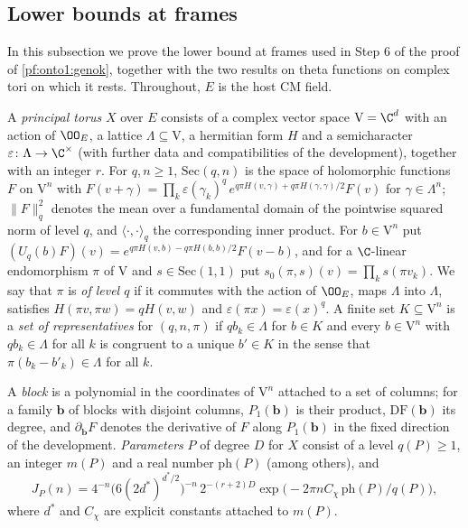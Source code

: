 \subsection{Lower bounds at frames}\label{sec:pf:onto1:frames}

In this subsection we prove the lower bound at frames used in Step 6 of the proof of \cref{pf:onto1:genok}, together with the
two results on theta functions on complex tori on which it rests. Throughout, $E$ is the host CM field.

\begin{definition}\label{pf:onto1:ptorus}
A \emph{principal torus} $X$ over $E$ consists of a complex vector space $\mathrm{V}=\C^{d}$ with an action of $\OO_E$, a lattice
$\Lambda\subseteq\mathrm V$, a hermitian form $H$ and a semicharacter $\varepsilon\colon\Lambda\to\C^\times$ (with further
data and compatibilities of the development), together with an integer $r$. For $q,n\ge1$, $\mathrm{Sec}(q,n)$ is the space of
holomorphic functions $F$ on $\mathrm V^n$ with $F(v+\gamma)=\prod_k\varepsilon(\gamma_k)^q\,e^{q\pi H(v,\gamma)+q\pi H(\gamma,\gamma)/2}F(v)$ for
$\gamma\in\Lambda^n$; $\|F\|_q^2$ denotes the mean over a fundamental domain of the pointwise squared norm of level $q$, and
$\langle\cdot,\cdot\rangle_q$ the corresponding inner product. For $b\in\mathrm V^n$ put $(U_q(b)F)(v)=e^{q\pi H(v,b)-q\pi H(b,b)/2}F(v-b)$, and
for a $\C$-linear endomorphism $\pi$ of $\mathrm V$ and $s\in\mathrm{Sec}(1,1)$ put $s_0(\pi,s)(v)=\prod_ks(\pi v_k)$. We say that $\pi$ is \emph{of level $q$} if it commutes
with the action of $\OO_E$, maps $\Lambda$ into $\Lambda$, satisfies $H(\pi v,\pi w)=qH(v,w)$ and $\varepsilon(\pi x)=\varepsilon(x)^q$. A
finite set $K\subseteq\mathrm V^n$ is a \emph{set of representatives} for $(q,n,\pi)$ if $qb_k\in\Lambda$ for $b\in K$ and every
$b\in\mathrm V^n$ with $qb_k\in\Lambda$ for all $k$ is congruent to a unique $b'\in K$ in the sense that $\pi(b_k-b'_k)\in\Lambda$ for
all $k$.

A \emph{block} is a polynomial in the coordinates of $\mathrm V^n$ attached to a set of columns; for a family $\mathbf b$ of
blocks with disjoint columns, $P_1(\mathbf b)$ is their product, $\mathrm{DF}(\mathbf b)$ its degree, and $\partial_{\mathbf b}F$
denotes the derivative of $F$ along $P_1(\mathbf b)$ in the fixed direction of the development. \emph{Parameters} $P$ of degree
$D$ for $X$ consist of a level $q(P)\ge1$, an integer $m(P)$ and a real number $\mathrm{ph}(P)$ (among others), and
\[
J_P(n)=4^{-n}\bigl(6(2d^*)^{d^*/2}\bigr)^{-n}\,2^{-(r+2)D}\exp\bigl(-2\pi nC_\chi\,\mathrm{ph}(P)/q(P)\bigr),
\]
where $d^*$ and $C_\chi$ are explicit constants attached to $m(P)$.
\end{definition}

